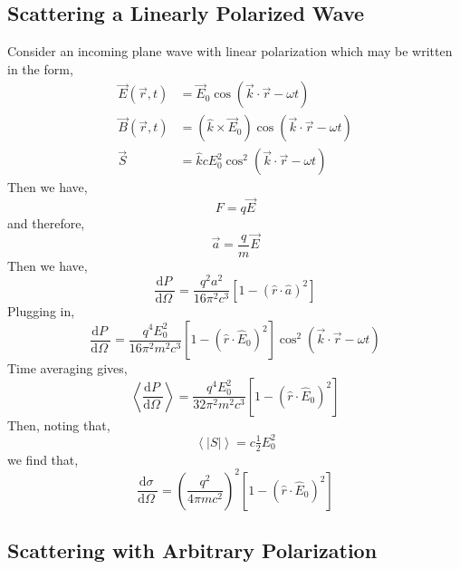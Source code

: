 \documentclass[12pt]{extarticle}
\renewcommand{\d}[1]{ \mathrm{d}#1 \:}
\newcommand{\deriv}[2]{\frac{\d{#1}}{\d{#2}}}
\theoremstyle{definition}
\begin{document}
\subsection{Scattering a Linearly Polarized Wave}

Consider an incoming plane wave with linear polarization which may be written in the form, 
\begin{align*}
\vec{E}(\vec{r}, t) & = \vec{E}_0 \cos{(\vec{k} \cdot \vec{r} - \omega t)} 
\\
\vec{B}(\vec{r}, t) & = (\hat{k} \times \vec{E}_0) \cos{(\vec{k} \cdot \vec{r} - \omega t)} 
\\
\vec{S} & = \hat{k} c E_0^2 \cos^2{(\vec{k} \cdot \vec{r} - \omega t)} 
\end{align*}
Then we have,
\[ F = q \vec{E} \]
and therefore,
\[ \vec{a} = \frac{q}{m} \vec{E} \]
Then we have,
\[ \deriv{P}{\Omega} = \frac{q^2 a^2}{16 \pi^2 c^3} [1 - (\hat{r} \cdot \hat{a})^2] \]
Plugging in,
\[ \deriv{P}{\Omega} = \frac{q^4 E_0^2}{16 \pi^2 m^2 c^3} [1 - (\hat{r} \cdot \hat{E}_0)^2] \cos^2{(\vec{k} \cdot \vec{r} - \omega t)}  \]
Time averaging gives,
\[ \left< \deriv{P}{\Omega} \right> = \frac{q^4 E_0^2}{32 \pi^2 m^2 c^3} [1 - (\hat{r} \cdot \hat{E}_0)^2]  \]
Then, noting that,
\[ \left< |S| \right> = c \tfrac{1}{2} E_0^2 \]
we find that,
\[ \deriv{\sigma}{\Omega} = \left( \frac{q^2}{4 \pi m c^2} \right)^2 [1 - (\hat{r} \cdot \hat{E}_0)^2] \]

\subsection{Scattering with Arbitrary Polarization}
\end{document}
